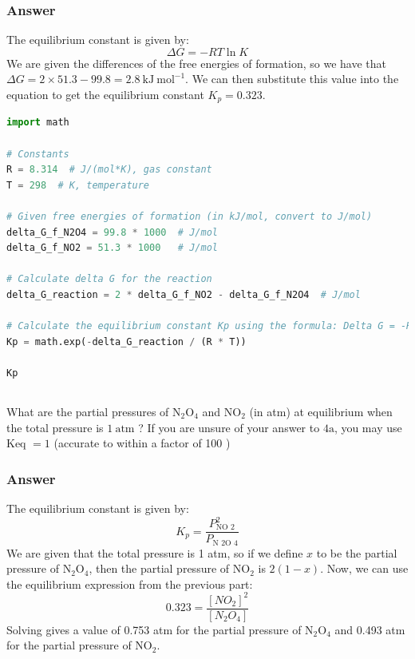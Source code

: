 \documentclass[12pt]{article}
\begin{document}
\subsubsection{Answer}
The equilibrium constant is given by:
\begin{equation}
  \Delta G = -RT \ln K
\end{equation}
We are given the differences of the free energies of formation, so we have that $\Delta G = 2 \times 51.3 - 99.8 = 2.8 \mathrm{~kJ} \mathrm{~mol}^{-1}$. We can then substitute this value into the equation to get the equilibrium constant $K_p = 0.323$.
\begin{lstlisting}[language=Python]
import math

# Constants
R = 8.314  # J/(mol*K), gas constant
T = 298  # K, temperature

# Given free energies of formation (in kJ/mol, convert to J/mol)
delta_G_f_N2O4 = 99.8 * 1000  # J/mol
delta_G_f_NO2 = 51.3 * 1000   # J/mol

# Calculate delta G for the reaction
delta_G_reaction = 2 * delta_G_f_NO2 - delta_G_f_N2O4  # J/mol

# Calculate the equilibrium constant Kp using the formula: Delta G = -RT ln Kp
Kp = math.exp(-delta_G_reaction / (R * T))

Kp
\end{lstlisting}
\subsection{}

What are the partial pressures of $\mathrm{N}_{2} \mathrm{O}_{4}$ and $\mathrm{NO}_{2}$ (in atm) at equilibrium when the total pressure is $1 \mathrm{~atm}$ ? If you are unsure of your answer to $4 \mathrm{a}$, you may use Keq $=1$ (accurate to within a factor of 100 )
\subsubsection{Answer}
The equilibrium constant is given by:
\begin{equation}
  K_p = \frac{P_{\text {NO } 2}^{2}}{P_{\text {N } 2 \text {O } 4}}
\end{equation}
We are given that the total pressure is 1 atm, so if we define $x$ to be the partial pressure of $\mathrm{N}_{2} \mathrm{O}_{4}$, then the partial pressure of $\mathrm{NO}_{2}$ is $2(1-x)$. Now, we can use the equilibrium expression from the previous part:
\begin{equation}
  0.323 = \frac{[NO_2]^2}{[N_2O_4]}
\end{equation}
Solving gives a value of 0.753 atm for the partial pressure of $\mathrm{N}_{2} \mathrm{O}_{4}$ and 0.493 atm for the partial pressure of $\mathrm{NO}_{2}$.
\end{document}
